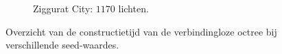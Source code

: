 \begin{figure}[t]
\begin{adjustbox}{minipage=\textwidth, scale=0.55}
\begin{subfigure}[b]{0.8\textwidth}
      \label{fig:hs-seed-exec:city-low}
    \end{subfigure}
  \end{adjustbox}\hspace{-0.075\textwidth}  %
  \begin{adjustbox}{minipage=\textwidth, scale=0.55}
    \begin{subfigure}[b]{0.8\textwidth}
      \centering
      \def\svgwidth{\textwidth}
      
      \caption{Ziggurat City: $1170$ lichten.}
      \label{fig:hs-seed-exec:city-high}
    \end{subfigure}
  \end{adjustbox}
  \caption{Overzicht van de constructietijd van de verbindingloze octree bij
           verschillende seed-waardes.}
  \label{fig:hs-seed-exec}
\end{figure}

